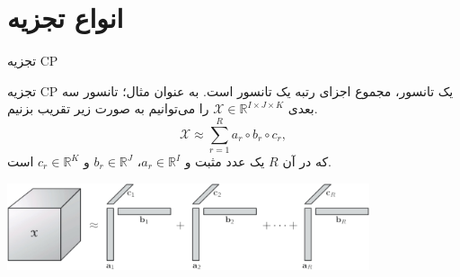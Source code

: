 \section{انواع تجزیه}
\begin{frame}[standout]
تجزیه CP
\end{frame}
\begin{frame}
تجزیه CP یک تانسور، مجموع اجزای رتبه یک تانسور است. به عنوان مثال؛ تانسور سه بعدی 
$\mathcal{X}\in \mathbb{R}^{I\times J\times K}$
را می‌توانیم به صورت زیر تقریب بزنیم.
\[\mathcal{X}\approx \sum_{r=1}^Ra_r \circ b_r \circ c_r,\]
که در آن $R$ یک عدد مثبت و  
$a_r\in\mathbb{R}^I$،
$b_r\in\mathbb{R}^J$
و
$c_r\in\mathbb{R}^K$
است.

\pause
\begin{center}
	\includegraphics[width=0.8\textwidth]{img/ok/cp.pdf}
\end{center}
\end{frame}

